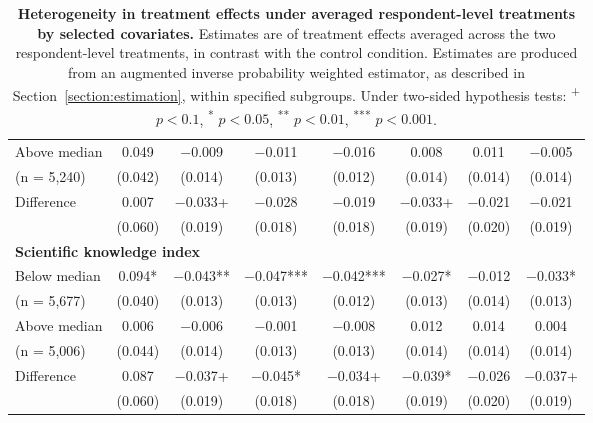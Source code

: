 \begin{table}[H]
{\begin{tabular}{lccccccc}
\hspace{1em} Above median 		& \num{0.049} & \num{-0.009} & \num{-0.011} & \num{-0.016} & \num{0.008} & \num{0.011} & \num{-0.005}\\
\hspace{1.5em} (n = 5,240)  		& (\num{0.042}) & (\num{0.014}) & (\num{0.013}) & (\num{0.012}) & (\num{0.014}) & (\num{0.014}) & (\num{0.014})\\
 \cmidrule(lr){2-8}
\hspace{1em} Difference 			& \num{0.007} & \num{-0.033}+ & \num{-0.028} & \num{-0.019} & \num{-0.033}+ & \num{-0.021} & \num{-0.021}\\
 							& (\num{0.060}) & (\num{0.019}) & (\num{0.018}) & (\num{0.018}) & (\num{0.019}) & (\num{0.020}) & (\num{0.019})\\
 \multicolumn{4}{l}{\textbf{Scientific knowledge index }}  \rule{0pt}{1.2\normalbaselineskip}\\
\hspace{1em}   Below median  			& \num{0.094}* & \num{-0.043}** & \num{-0.047}*** & \num{-0.042}*** & \num{-0.027}* & \num{-0.012} & \num{-0.033}*\\
\hspace{1.5em} (n = 5,677)			& (\num{0.040}) & (\num{0.013}) & (\num{0.013}) & (\num{0.012}) & (\num{0.013}) & (\num{0.014}) & (\num{0.013})\\
\hspace{1em}   Above median			& \num{0.006} & \num{-0.006} & \num{-0.001} & \num{-0.008} & \num{0.012} & \num{0.014} & \num{0.004}\\
\hspace{1.5em}  (n = 5,006) 			& (\num{0.044}) & (\num{0.014}) & (\num{0.013}) & (\num{0.013}) & (\num{0.014}) & (\num{0.014}) & (\num{0.014})\\
 \cmidrule(lr){2-8}
\hspace{1em}   Difference 			& \num{0.087} 	& \num{-0.037}+ & \num{-0.045}* & \num{-0.034}+ & \num{-0.039}* & \num{-0.026} & \num{-0.037}+\\
 								& (\num{0.060}) & (\num{0.019}) & (\num{0.018}) & (\num{0.018}) & (\num{0.019}) & (\num{0.020}) & (\num{0.019})\\
    \end{tabular}
   }
   \caption{\textbf{Heterogeneity in treatment effects under averaged respondent-level treatments by selected covariates.} Estimates are of treatment effects averaged across the two respondent-level treatments, in contrast with the control condition. Estimates are produced from an augmented inverse probability weighted estimator, as described in Section~\ref{section:estimation}, within specified subgroups. Under two-sided hypothesis tests: \textsuperscript{+} $p<0.1$, \textsuperscript{*} $p < 0.05$, \textsuperscript{**} $p < 0.01$, \textsuperscript{***} $p < 0.001$.}
  \label{tab:heterogeneity_treatment}
\end{table}
